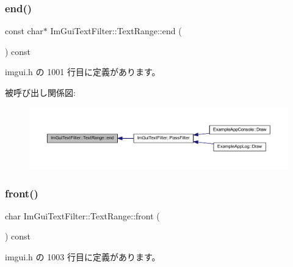 \subsubsection{\texorpdfstring{end()}{end()}}
{\footnotesize\ttfamily const char$\ast$ Im\+Gui\+Text\+Filter\+::\+Text\+Range\+::end (\begin{DoxyParamCaption}{ }\end{DoxyParamCaption}) const\hspace{0.3cm}{\ttfamily [inline]}}



 imgui.\+h の 1001 行目に定義があります。

被呼び出し関係図\+:\nopagebreak
\begin{figure}[H]
\begin{center}
\leavevmode
\includegraphics[width=350pt]{struct_im_gui_text_filter_1_1_text_range_aa5d60286f4c35bfdde82219ff079de9e_icgraph}
\end{center}
\end{figure}
\mbox{\label{struct_im_gui_text_filter_1_1_text_range_a7d0b405b4db5d33351812b4b3b6e9107}} 
\subsubsection{\texorpdfstring{front()}{front()}}
{\footnotesize\ttfamily char Im\+Gui\+Text\+Filter\+::\+Text\+Range\+::front (\begin{DoxyParamCaption}{ }\end{DoxyParamCaption}) const\hspace{0.3cm}{\ttfamily [inline]}}



 imgui.\+h の 1003 行目に定義があります。

